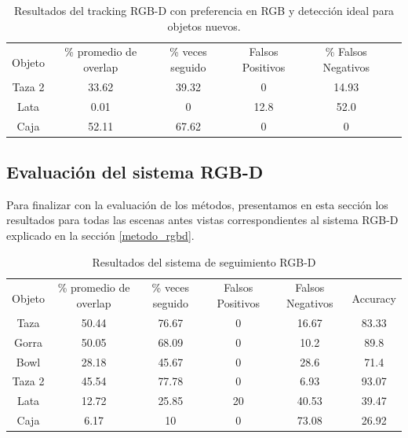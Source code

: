 \begin{table}[h]
    \begin{tabular}{|c|c|c|c|c|c|}
    \hline
    & \multirow{2}{2.4cm}{\% promedio de overlap} & \multirow{2}{2cm}{\% veces seguido} & \multirow{2}{1.6cm}{Falsos Positivos} & \multirow{2}{1.6cm}{\% Falsos Negativos}\\
	Objeto & & & &\\
    \hline
    Taza 2  & 33.62      & 39.32      & 0       & 14.93\\
    \hline
    Lata    &  0.01      &     0      & 12.8    &  52.0\\
    \hline
    Caja    & 52.11      & 67.62      & 0       &     0\\
    \hline
    \end{tabular}
\caption{Resultados del tracking RGB-D con preferencia en RGB y detección ideal para objetos nuevos.}
\label{tabla_rgbd_rgb_nuevos}
\end{table}



\subsection{Evaluación del sistema RGB-D}\label{sec:evaluacion_rgbd}
Para finalizar con la evaluación de los métodos, presentamos en esta sección los resultados para todas las escenas antes vistas correspondientes al sistema RGB-D explicado en la sección \ref{metodo_rgbd}.

\begin{table}[h]
    \begin{tabular}{|c|c|c|c|c|c|}
    \hline
    & \multirow{2}{2.4cm}{\% promedio de overlap} & \multirow{2}{2cm}{\% veces seguido} & \multirow{2}{1.6cm}{Falsos Positivos} & \multirow{2}{1.6cm}{Falsos Negativos}\\
	Objeto & & & & & Accuracy\\
	\hline
    Taza    & 50.44      & 76.67     &    0           & 16.67    & 83.33 \\
    \hline
    Gorra   & 50.05      & 68.09     &    0           &  10.2    & 89.8 \\
    \hline
    Bowl    & 28.18      & 45.67     &    0           &  28.6    & 71.4 \\
    \hline
    Taza 2  & 45.54      & 77.78     &    0           &  6.93    & 93.07 \\
    \hline
    Lata    & 12.72      & 25.85     &   20           & 40.53    & 39.47 \\
    \hline
    Caja    &  6.17      &    10     &    0           & 73.08    & 26.92 \\
    \hline
    \end{tabular}
\caption{Resultados del sistema de seguimiento RGB-D}
\label{tabla_sistema_rgbd}
\end{table}


